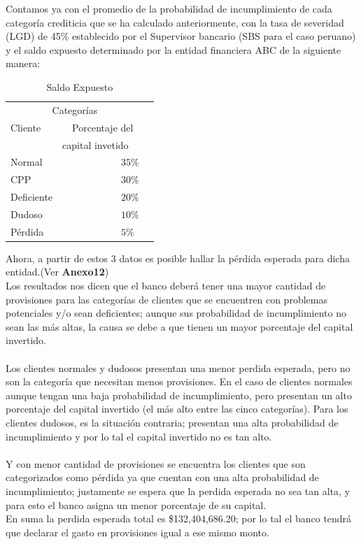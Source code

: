 \documentclass[11pt,fleqn]{book} %
\numberwithin{equation}{section} %
\numberwithin{figure}{section} %
\numberwithin{table}{section} %
\begin{document}
Contamos ya con el promedio de la probabilidad de incumplimiento de cada categoría crediticia que se ha calculado anteriormente, con la tasa de severidad (LGD) de 45\% establecido por el Supervisor bancario (SBS para el caso peruano) y el saldo expuesto determinado por la entidad financiera ABC de la siguiente manera: 
\begin{table}[H]
\caption{Saldo Expuesto}
\centering
\begin{tabular}{llr}
\toprule
\multicolumn{2}{c}{Categorías} \\
\cmidrule(r){1-2}
Cliente & \ \ Porcentaje del\\ & capital invetido \\
\midrule
Normal & \ \ \ \ \ \ \ \ \ \ \ \ $35\%$ \\
CPP & \ \ \ \ \ \ \ \ \ \ \ \ $30\%$ \\
Deficiente & \ \ \ \ \ \ \ \ \ \ \ \ $20\%$ \\
Dudoso &  \ \ \ \ \ \ \ \ \ \ \ \ $10\%$ \\
Pérdida &  \ \ \ \ \ \ \ \ \ \ \ \ $5\%$ \\
\bottomrule
\end{tabular}
\end{table}
Ahora, a partir de estos 3 datos es posible hallar la pérdida esperada para dicha entidad.(Ver \textbf{Anexo12})
\\
Los resultados nos dicen que el banco deberá tener una mayor cantidad de  provisiones para las categorías de clientes que se encuentren  con problemas potenciales y/o sean deficientes; aunque sus probabilidad de incumplimiento no sean las más  altas, la causa se debe a que tienen un mayor porcentaje del capital invertido.
\\\\
Los clientes normales y dudosos presentan una menor perdida esperada, pero  no son la categoría que necesitan menos provisiones. En el caso de clientes normales aunque tengan una baja probabilidad de incumplimiento, pero presentan un alto porcentaje del capital invertido (el más alto entre las cinco categorías). Para los clientes dudosos, es la situación contraria;  presentan una alta probabilidad de incumplimiento y por lo tal el capital invertido no es tan alto.
\\\\
Y con menor cantidad de provisiones se encuentra los clientes que son categorizados como pérdida ya que cuentan con una alta probabilidad de incumplimiento; justamente se espera que  la perdida esperada no sea tan alta, y para esto el banco asigna un menor porcentaje de su capital.\\
En suma la perdida esperada total es \$132,404,686.20; por lo tal el banco tendrá que declarar el gasto en provisiones igual a ese mismo monto.\\
\end{document}
